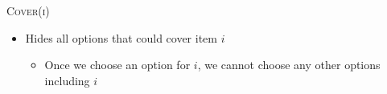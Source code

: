 \documentclass[aspectratio=169]{beamer}
\begin{document}
{
    \frame{}
}


\begin{frame}{\textsc{Cover(i)}}
\begin{itemize}
    \item Hides all options that could cover item $i$
    \begin{itemize}
        \item Once we choose an option for $i$, we cannot choose any other options including $i$
    \end{itemize}
\end{itemize}
    
\end{frame}
\end{document}
